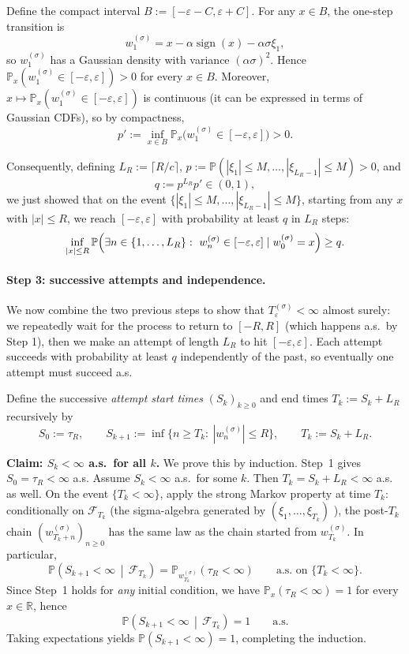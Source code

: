 \documentclass{article}
\theoremstyle{plain}
\theoremstyle{definition}
\theoremstyle{remark}
\newcommand{\R}{\mathbb{R}}
\newcommand{\PP}{\mathbb{P}}
\newcommand{\cF}{\mathcal{F}}
\newcommand{\stepsize}{\alpha}
\newcommand{\sign}{\operatorname{sign}}
\newcommand{\eps}{\varepsilon}
\begin{document}
Define the compact interval $B:=[-\eps-C,\eps+C]$. For any $x\in B$, the one-step transition is
\[
w_1^{(\sigma)} = x - \stepsize\sign(x) - \stepsize\sigma\xi_1,
\]
so $w_1^{(\sigma)}$ has a Gaussian density with variance $(\stepsize\sigma)^2$.
Hence $\PP_x(w_1^{(\sigma)}\in[-\eps,\eps])>0$ for every $x\in B$.
Moreover, $x\mapsto \PP_x(w_1^{(\sigma)}\in[-\eps,\eps])$ is continuous
(it can be expressed in terms of Gaussian CDFs), so by compactness,
\[
p' := \inf_{x\in B}\PP_x\bigl(w_1^{(\sigma)}\in[-\eps,\eps]\bigr) > 0.
\]

Consequently, defining $L_R := \lceil R/c \rceil$, $p := \PP(|\xi_1|\le M,\dots,|\xi_{L_R-1}|\le M)>0$, and
\[
  q := p^{L_R}p' \in (0,1),
\]
we just showed that on the event
$\{|\xi_1|\le M,\dots,|\xi_{L_R-1}|\le M\}$, starting from any $x$ with $|x|\le R$,
we reach $[-\eps,\eps]$ with probability at least $q$ in $L_R$ steps:
\begin{equation}
\label{eq:one-attempt-success}
\inf_{|x|\le R}  
\PP\Bigl(\exists n\in\{1,\dots,L_R\}:\ w_n^{(\sigma)}\in[-\eps,\eps] \mid w_0^{(\sigma)}=x\Bigr)
  \ge q.
\end{equation}

\paragraph{Step 3: successive attempts and independence.} 
We now combine the two previous steps to show that
$T_\eps^{(\sigma)}<\infty$ almost surely: 
we repeatedly wait for the process to return 
to $[-R,R]$ (which happens a.s.\ by Step 1),
then we make an attempt of length $L_R$ to hit $[-\eps,\eps]$. 
Each attempt succeeds with probability at least $q$ 
independently of the past, so eventually one attempt must succeed a.s. 

Define the successive \emph{attempt start times} $(S_k)_{k\ge 0}$ and end times
$T_k:=S_k+L_R$ recursively by
\[
  S_0 := \tau_R,
  \qquad
  S_{k+1} := \inf\{n\ge T_k:\ |w_n^{(\sigma)}|\le R\},
  \qquad
  T_k := S_k+L_R.
\]

\medskip
\noindent\textbf{Claim: $S_k<\infty$ a.s.\ for all $k$.}
We prove this by induction.
Step~1 gives $S_0=\tau_R<\infty$ a.s.
Assume $S_k<\infty$ a.s.\ for some $k$. Then $T_k=S_k+L_R<\infty$ a.s. as well.
On the event $\{T_k<\infty\}$, apply the strong Markov property at time $T_k$:
conditionally on $\cF_{T_k}$
(the sigma-algebra generated by $(\xi_1,\dots,\xi_{T_k})$ \citep[Def 12.8]{LeGall2022}), 
the post-$T_k$ chain
$(w_{T_k+n}^{(\sigma)})_{n\ge0}$ has the same law as the chain started from
$w_{T_k}^{(\sigma)}$. In particular,
\[
\PP\!\left(S_{k+1}<\infty \,\middle|\, \cF_{T_k}\right)
=
\PP_{w_{T_k}^{(\sigma)}}(\tau_R<\infty)
\qquad\text{a.s. on }\{T_k<\infty\}.
\]
Since Step~1 holds for \emph{any} initial condition, we have
$\PP_x(\tau_R<\infty)=1$ for every $x\in\R$, hence
\[
\PP\!\left(S_{k+1}<\infty \,\middle|\, \cF_{T_k}\right)=1
\qquad\text{a.s.}
\]
Taking expectations yields $\PP(S_{k+1}<\infty)=1$, completing the induction.
\end{document}

